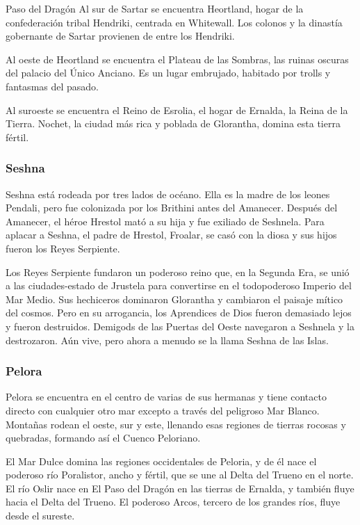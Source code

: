 \begin{GloranthaInfoBox}{Paso del Dragón}
    Al sur de Sartar se encuentra Heortland, hogar de la confederación tribal Hendriki, centrada en Whitewall. Los colonos y la dinastía gobernante de Sartar provienen de entre los Hendriki.
	
    Al oeste de Heortland se encuentra el Plateau de las Sombras, las ruinas oscuras del palacio del Único Anciano. Es un lugar embrujado, habitado por trolls y fantasmas del pasado.
	
    Al suroeste se encuentra el Reino de Esrolia, el hogar de Ernalda, la Reina de la Tierra. Nochet, la ciudad más rica y poblada de Glorantha, domina esta tierra fértil.
\end{GloranthaInfoBox}

\subsubsection{Seshna}
Seshna está rodeada por tres lados de océano. Ella es la madre de los leones Pendali, pero fue colonizada por los Brithini antes del Amanecer. Después del Amanecer, el héroe Hrestol mató a su hija y fue exiliado de Seshnela. Para aplacar a Seshna, el padre de Hrestol, Froalar, se casó con la diosa y sus hijos fueron los Reyes Serpiente. 

Los Reyes Serpiente fundaron un poderoso reino que, en la Segunda Era, se unió a las ciudades-estado de Jrustela para convertirse en el todopoderoso Imperio del Mar Medio. Sus hechiceros dominaron Glorantha y cambiaron el paisaje mítico del cosmos. Pero en su arrogancia, los Aprendices de Dios fueron demasiado lejos y fueron destruidos. Demigods de las Puertas del Oeste navegaron a Seshnela y la destrozaron. Aún vive, pero ahora a menudo se la llama Seshna de las Islas.

\subsubsection{Pelora}
Pelora se encuentra en el centro de varias de sus hermanas y tiene contacto directo con cualquier otro mar excepto a través del peligroso Mar Blanco. Montañas rodean el oeste, sur y este, llenando esas regiones de tierras rocosas y quebradas, formando así el Cuenco Peloriano. 

El Mar Dulce domina las regiones occidentales de Peloria, y de él nace el poderoso río Poralistor, ancho y fértil, que se une al Delta del Trueno en el norte. El río Oslir nace en El Paso del Dragón en las tierras de Ernalda, y también fluye hacia el Delta del Trueno. El poderoso Arcos, tercero de los grandes ríos, fluye desde el sureste. 

